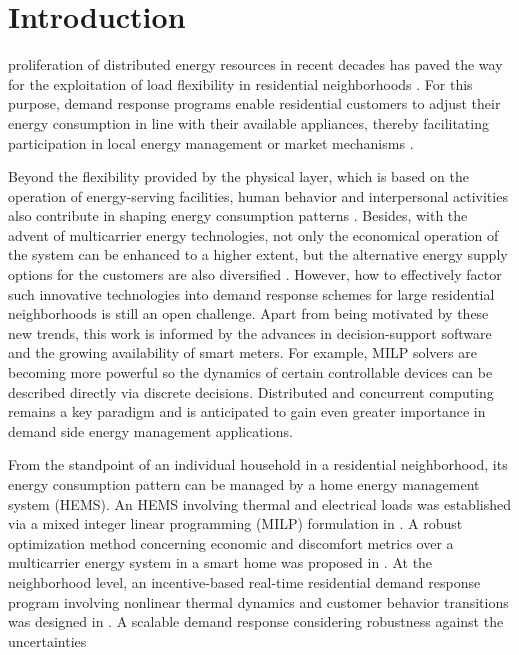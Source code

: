 \documentclass[journal]{IEEEtran}
\begin{document}
\section{Introduction}\label{section:one}
 proliferation of distributed energy resources in recent
decades has paved the way for the exploitation of load flexibility in residential neighborhoods \cite{market2025, energymanagement2017, smartHEMS2021}.
For this purpose, demand response programs enable residential customers to adjust
their energy consumption in line with their available appliances, thereby facilitating
participation in local energy management or market mechanisms \cite{integratedDR2023}.
\par
Beyond the flexibility provided by the physical layer, which is based on the operation
of energy-serving facilities, human behavior and interpersonal activities also contribute
in shaping energy consumption patterns \cite{cpss2022}.
Besides, with the advent of multicarrier energy technologies,
not only the economical operation of the system can be enhanced to a higher extent,
but the alternative energy supply options for the customers are also diversified \cite{multicarrier2022}.
However, how to effectively factor such innovative technologies into demand response schemes
for large residential neighborhoods is still an open challenge.
Apart from being motivated by these new trends, this work is informed by the
advances in decision-support software and the growing availability of smart meters.
For example, MILP solvers are becoming more powerful so the dynamics of certain
controllable devices can be described directly via discrete decisions.
Distributed and concurrent computing remains a key paradigm and is anticipated to gain
even greater importance in demand side energy management applications.
\par
From the standpoint of an individual household in a residential neighborhood, its energy consumption
pattern can be managed by a home energy management system (HEMS).
An HEMS involving thermal and electrical loads
was established via a mixed integer linear programming (MILP) formulation in \cite{HEMS2018}.
A robust optimization method concerning economic and discomfort metrics over a
multicarrier energy system in a smart home was proposed in \cite{integrated2023}.
At the neighborhood level, an incentive-based real-time residential demand response
program involving nonlinear thermal dynamics and customer behavior transitions
was designed in \cite{chenxin2021}.
A scalable demand response considering robustness against the uncertainties
\end{document}
